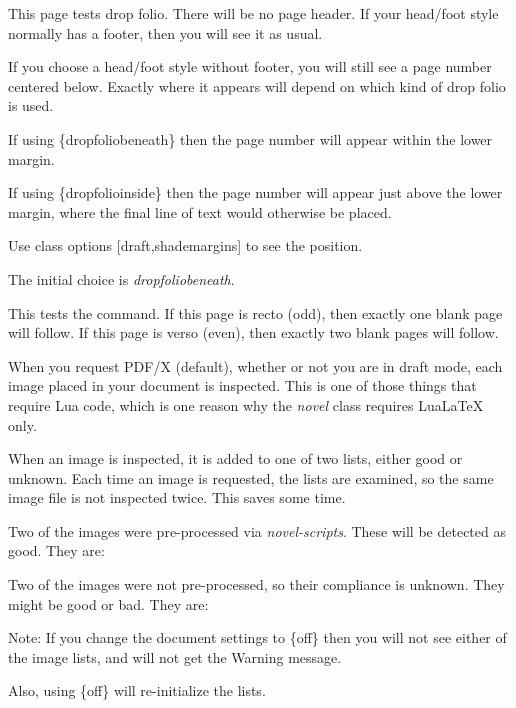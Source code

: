 \documentclass[test,shademargins,draft]{novel} %
\begin{document}
\clearpage



\thispagestyle{dropfoliobeneath} %

This page tests drop folio. There will be no page header. If your head/foot style normally has a footer, then you will see it as usual.

If you choose a head/foot style without footer, you will still see a page number centered below. Exactly where it appears will depend on which kind of drop folio is used.

If using \string\thispagestyle\{dropfoliobeneath\} then the page number will appear within the lower margin.

If using \string\thispagestyle\{dropfolioinside\} then the page number will appear just above the lower margin, where the final line of text would otherwise be placed. 

Use class options [draft,shademargins] to see the position.

The initial choice is \textit{dropfoliobeneath}.

\clearpage


This tests the \string\cleartoend\space command. If this page is recto (odd), then exactly one blank page will follow. If this page is verso (even), then exactly two blank pages will follow.

\null\null


When you request PDF/X (default), whether or not you are in draft mode, each image placed in your document is inspected. This is one of those things that require Lua code, which is one reason why the \textit{novel} class requires LuaLaTeX only.

When an image is inspected, it is added to one of two lists, either good or unknown. Each time an image is  requested, the lists are examined, so the same image file is not inspected twice. This saves some time.

\null

Two of the images were pre-processed via \textit{novel-scripts}. These will be detected as good. They are:

\makeatletter\@AllGoodImages\makeatother

\null

Two of the images were not pre-processed, so their compliance is unknown. They might be good or bad. They are:

 \makeatletter\@UnknownImages\makeatother

\null

Note: If you change the document settings to \string\SetPDFX\{off\} then you will not see either of the image lists, and will not get the Warning message.

Also, using \string\SetPDFX\{off\} will re-initialize the lists.
\end{document}
